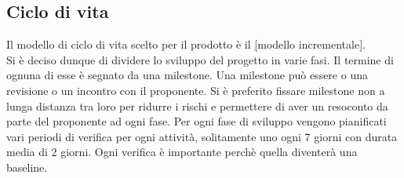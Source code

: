	\subsection{Ciclo di vita}
		Il modello di ciclo di vita scelto per il prodotto è il \underline[modello incrementale].\\Si è deciso dunque di dividere lo sviluppo del progetto in varie fasi. Il termine di ognuna di esse è segnato da una milestone. Una milestone può essere o una revisione o un incontro con il proponente. Si è preferito fissare milestone non a lunga distanza tra loro per ridurre i rischi e permettere di aver un resoconto da parte del proponente ad ogni fase. Per ogni fase di sviluppo vengono pianificati vari periodi di verifica per ogni attività, solitamente uno ogni 7 giorni con durata media di 2 giorni. Ogni verifica è importante perchè quella diventerà una baseline.
